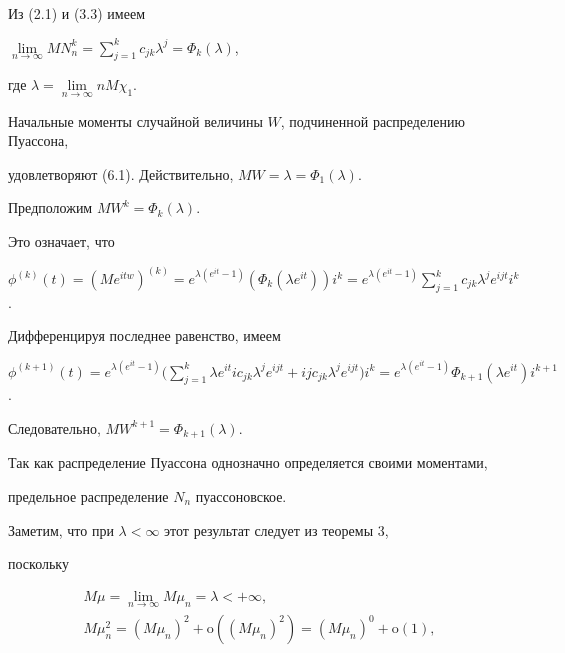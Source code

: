 Из (2.1) и (3.3) имеем


$\lim\limits_{n\to\infty} MN_n^k=\sum\limits_{j=1}^k c_{jk} \lambda^j=


\Phi_k(\lambda)$, 


где $\lambda=\lim\limits_{n\to\infty} n M \chi_1$.





Начальные моменты случайной величины $W$, подчиненной распределению Пуассона,


удовлетворяют (6.1). Действительно, $MW=\lambda=\Phi_1(\lambda)$. 


Предположим $MW^k=\Phi_k(\lambda)$.


Это означает, что


$\phi^{(k)}(t)=(M e^{itw})^{(k)}= e^{\lambda(e^{it}-1)}


(\Phi_k(\lambda e^{it}))i^k=e^{\lambda(e^{it}-1)}


\sum\limits_{j=1}^k c_{jk}\lambda^j e^{ijt} i^k$.


Дифференцируя последнее равенство, имеем


$\phi^{(k+1)}(t)=e^{\lambda(e^{it}-1)}


\Big(\sum\limits_{j=1}^k \lambda e^{it} i c_{jk}


\lambda^j e^{ijt}+i j c_{jk} \lambda^j e^{ijt}\Big)i^k=


e^{\lambda(e^{it}-1)} \Phi_{k+1}(\lambda e^{it}) i^{k+1}$.


Следовательно, $MW^{k+1}=\Phi_{k+1}(\lambda)$.





Так как распределение Пуассона однозначно определяется своими моментами,


предельное распределение $N_n$ пуассоновское.





Заметим, что при $\lambda<\infty$ этот результат следует из теоремы 3,


поскольку


\begin{gather*}


M\mu=\lim_{n\to\infty} M\mu_n = \lambda<+\infty,\\


M\mu_n^2={(M\mu_n)}^2+{\mathrm o}({(M\mu_n)}^2)={(M\mu_n)}^0+


{\mathrm o}(1),


\end{gather*}



